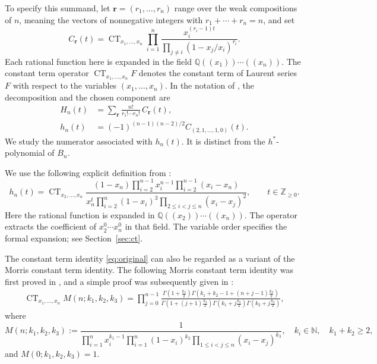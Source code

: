 \documentclass[reqno, 12pt]{article}
\numberwithin{equation}{section}
\theoremstyle{definition}
\DeclareMathOperator{\CT}{CT}
\newcommand{\NN}{\mathbb Z_{\geq0}}
\begin{document}
To specify this summand, let
$\boldsymbol r=(r_1,\ldots,r_n)$ range over the weak compositions
of $n$, meaning the vectors of nonnegative integers with
$r_1+\cdots+r_n=n$, and set
\[
 C_{\boldsymbol r}(t)=\CT_{x_1,\ldots,x_n}
 \prod_{i=1}^n
 \frac{x_i^{(r_i-1)t}}{\prod_{j\ne i}(1-x_j/x_i)^{r_i}}.
\]
Each rational function here is expanded in the field $\mathbb Q((x_1))\cdots((x_n))$. 
The constant term operator $\CT_{x_1,\ldots,x_n} F$ denotes the constant term of Laurent series $F$ with respect to the variables $(x_1,\ldots,x_n)$.
In the notation of \cite[Section~1 and (1.2)]{XZ}, the decomposition and the chosen component are
\begin{equation}\label{eq:birkhoff-component}
\begin{split}
 H_n(t)&=\sum_{\boldsymbol r}\frac{n!}{r_1!\cdots r_n!}\,C_{\boldsymbol r}(t),\\
 h_n(t)&=(-1)^{(n-1)(n-2)/2}C_{(2,1,\ldots,1,0)}(t).
\end{split}
\end{equation}
We study the numerator associated with $h_n(t)$.  It is distinct
from the $h^*$-polynomial of $B_n$.

We use the following explicit definition from \cite[(1.2)--(1.3)]{XZ}:
\begin{equation}\label{eq:original}
h_n(t)=\CT_{x_2,\ldots,x_n}\frac{(1-x_n)\displaystyle\prod_{i=2}^{n-1}x_i^{n-1}
\prod_{i=2}^{n-1}(x_i-x_n)}{x_n^t\displaystyle\prod_{i=2}^{n}(1-x_i)^3
\prod_{2\leq i<j\leq n}(x_i-x_j)^2},
\qquad t\in\NN.
\end{equation}
Here the rational function is expanded in $\mathbb Q((x_2))\cdots((x_n))$.  The operator extracts the
coefficient of $x_2^0\cdots x_n^0$ in that field.  The variable order specifies the formal expansion; see Section~\cref{sec:ct}.

The constant term identity \eqref{eq:original} can also be regarded as a variant of the Morris constant term identity.
The following Morris constant term identity was first proved in \cite{MorrisBV}, and a simple proof was subsequently given in \cite{XinThesis}:
\begin{align}\label{Equation-Morrio-Equa}
\CT_{x_1, \ldots, x_n} M(n; k_1, k_2, k_3) = \prod_{j=0}^{n-1} \frac{\Gamma(1 + \frac{k_3}{2}) \Gamma(k_1 + k_2 - 1 + (n + j - 1)\frac{k_3}{2})}{\Gamma(1 + (j + 1)\frac{k_3}{2}) \Gamma(k_1 + j\frac{k_3}{2}) \Gamma(k_2 + j\frac{k_3}{2})},
\end{align}
where
\begin{equation*}
M(n; k_1, k_2, k_3) := \frac{1}{\prod_{i=1}^n x_i^{k_1-1} \prod_{i=1}^n (1 - x_i)^{k_2} \prod_{1 \le i < j \le n} (x_i - x_j)^{k_3}},\quad k_i \in \mathbb{N},\quad k_1 + k_2 \ge 2,
\end{equation*}
and \(M(0; k_1, k_2, k_3) = 1\).
\end{document}
